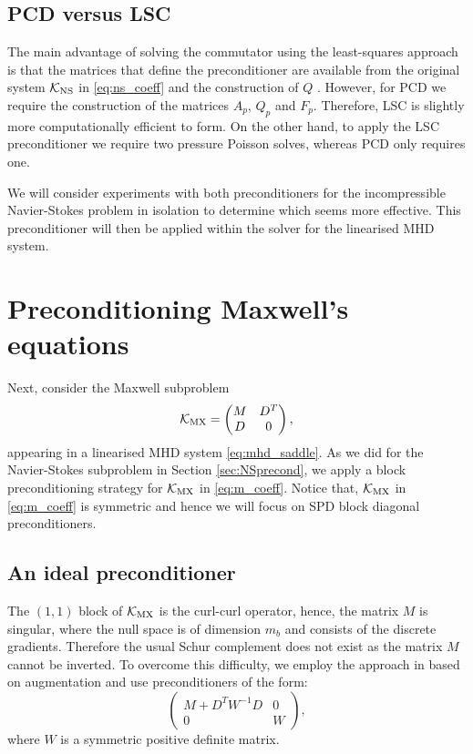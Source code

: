 \subsection{PCD versus LSC}

The main advantage of solving the commutator using the least-squares approach is that the matrices that define the preconditioner are available from the original system $\mathcal{K}_{\rm NS}$ in \eqref{eq:ns_coeff} and the construction of $Q$ . However, for PCD we require the construction of the matrices $A_p$, $Q_p$ and $F_p$. Therefore, LSC is slightly more computationally efficient to form. On the other hand, to apply the LSC preconditioner we require two pressure Poisson solves, whereas PCD only requires one.

We will consider experiments with both preconditioners for the incompressible Navier-Stokes problem in isolation to determine which seems more effective. This preconditioner  will then be applied within the solver for the linearised MHD system.

\section{Preconditioning Maxwell's equations}
\label{sec:MaxwellPrecond}

Next, consider the Maxwell subproblem
\begin{equation}
\label{eq:m_coeff}
\mathcal{K}_{\rm MX}=
\begin{pmatrix}
M & D^T \\
D & 0
\end{pmatrix},
\end{equation}
appearing in a linearised MHD system \eqref{eq:mhd_saddle}.
As we did for the Navier-Stokes subproblem in Section \ref{sec:NSprecond}, we apply a block preconditioning strategy for $\mathcal{K}_{\rm MX}$ in  \eqref{eq:m_coeff}. Notice that, $\mathcal{K}_{\rm MX}$ in \eqref{eq:m_coeff} is symmetric and hence we will focus on SPD block diagonal preconditioners.

\subsection{An ideal preconditioner}

The $(1,1)$ block of $\mathcal{K}_{\rm MX}$ is the curl-curl operator, hence, the matrix $M$ is singular, where the null space is of dimension $m_b$ and consists of the discrete gradients. Therefore the usual Schur complement does not exist as the matrix $M$ cannot be inverted. To overcome this difficulty, we employ the approach in  \cite{golub2003solving,greif2006preconditioners} based on  augmentation and use preconditioners of the form:
\begin{equation} \nonumber
\begin{pmatrix}
M+D^T W^{-1} D & 0 \\
0 & W
\end{pmatrix},
\end{equation}
where $W$ is a symmetric positive definite matrix.


